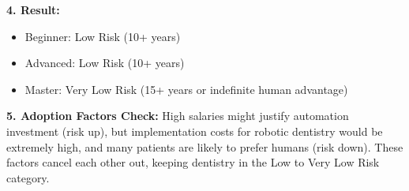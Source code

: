 \documentclass[
  11pt,
]{article}
\providecommand{\tightlist}{%
  \setlength{\itemsep}{0pt}\setlength{\parskip}{0pt}}
\begin{document}
\textbf{4. Result:}

\begin{itemize}
\tightlist
\item
  Beginner: Low Risk (10+ years)
\item
  Advanced: Low Risk (10+ years)
\item
  Master: Very Low Risk (15+ years or indefinite human advantage)
\end{itemize}

\textbf{5. Adoption Factors Check:} High salaries might justify
automation investment (risk up), but implementation costs for robotic
dentistry would be extremely high, and many patients are likely to
prefer humans (risk down). These factors cancel each other out, keeping
dentistry in the Low to Very Low Risk category.
\end{document}
